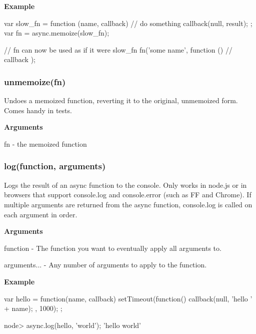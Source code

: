 {\bfseries Example} \begin{DoxyVerb}var slow_fn = function (name, callback) {
    // do something
    callback(null, result);
};
var fn = async.memoize(slow_fn);

// fn can now be used as if it were slow_fn
fn('some name', function () {
    // callback
});
\end{DoxyVerb}


\label{_unmemoize}%
 \subsubsection*{unmemoize(fn)}

Undoes a memoized function, reverting it to the original, unmemoized form. Comes handy in tests.

{\bfseries Arguments}


\begin{DoxyItemize}
\item fn -\/ the memoized function
\end{DoxyItemize}

\label{_log}%
 \subsubsection*{log(function, arguments)}

Logs the result of an async function to the console. Only works in node.\+js or in browsers that support console.\+log and console.\+error (such as F\+F and Chrome). If multiple arguments are returned from the async function, console.\+log is called on each argument in order.

{\bfseries Arguments}


\begin{DoxyItemize}
\item function -\/ The function you want to eventually apply all arguments to.
\item arguments... -\/ Any number of arguments to apply to the function.
\end{DoxyItemize}

{\bfseries Example} \begin{DoxyVerb}var hello = function(name, callback){
    setTimeout(function(){
        callback(null, 'hello ' + name);
    }, 1000);
};

node> async.log(hello, 'world');
'hello world'
\end{DoxyVerb}






